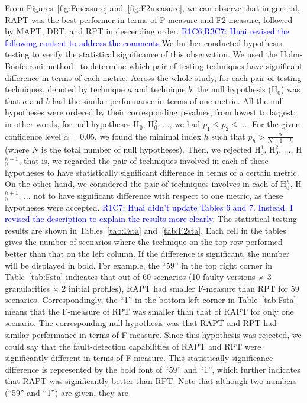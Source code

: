 \documentclass[10pt,journal,compsoc]{IEEEtran}
\begin{document}
\begin{figure*}[tp]
	\centering
	\caption{Boxplots of F2-measures on each object program}
	\label{fig:F2measure}
\end{figure*}

From Figures~\ref{fig:Fmeasure} and~\ref{fig:F2measure}, we can observe that in general, RAPT was the best performer in terms of F-measure and F2-measure, followed by MAPT, DRT, and RPT in descending order. \textcolor{blue}{R1C6,R3C7: Huai revised the following content to address the comments} We further conducted hypothesis testing to verify the statistical significance of this observation. We used the Holm-Bonferroni method~\cite{Holm79} to determine which pair of testing techniques have significant difference in terms of each metric. Across the whole study, for each pair of testing techniques, denoted by technique $a$ and technique $b$, the null hypothesis (H$_0$) was that $a$ and $b$ had the similar performance in terms of one metric. All the null hypotheses were ordered by their corresponding p-values, from lowest to largest; in other words, for null hypotheses H$_0^1$, H$_0^2$, $\ldots$, we had $p_1 \leq p_2 \leq \ldots$. For the given confidence level $\alpha = 0.05$, we found the minimal index $h$ such that $p_h > \displaystyle \frac{\alpha}{N+1-h}$ (where $N$ is the total number of null hypotheses). Then, we rejected H$_0^1$, H$_0^2$, $\ldots$, H$_0^{h-1}$, that is, we regarded the pair of techniques involved in each of these hypotheses to have statistically significant difference in terms of a certain metric. On the other hand, we considered the pair of techniques involves in each of H$_0^h$, H$_0^{h+1}$, $\ldots$ not to have significant difference with respect to one metric, as these hypotheses were accepted. \textcolor{blue}{R1C7: Huai didn't update Tables 6 and 7. Instead, I revised the description to explain the results more clearly.} The statistical testing results are shown in Tables~\ref{tab:Fsta} and~\ref{tab:F2sta}. Each cell in the tables gives the number of scenarios where the technique on the top row performed better than that on the left column. If the difference is significant, the number will be displayed in bold. For example, the ``59'' in the top right corner in Table~\ref{tab:Fsta} indicates that out of 60 scenarios (10 faulty versions $\times$ 3 granularities $\times$ 2 initial profiles), RAPT had smaller F-measure than RPT for 59 scenarios. Correspondingly, the ``1'' in the bottom left corner in Table~\ref{tab:Fsta} means that the F-measure of RPT was smaller than that of RAPT for only one scenario. The corresponding null hypothesis was that RAPT and RPT had similar performance in terms of F-measure. Since this hypothesis was rejected, we could say that the fault-detection capabilities of RAPT and RPT were significantly different in terms of F-measure. This statistically significance difference is represented by the bold font of ``59'' and ``1'', which further indicates that RAPT was significantly better than RPT. Note that although two numbers (``59'' and ``1'') are given, they are 
\end{document}

